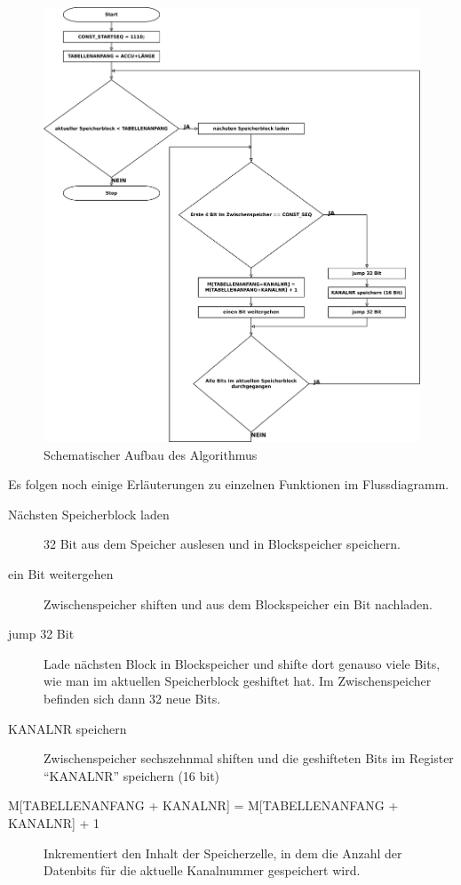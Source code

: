 \begin{figure}[htb]
    \centering
    \includegraphics[width=\textwidth]{pflichtenheft/res/algorithmus.pdf}
    \caption{Schematischer Aufbau des Algorithmus}
    \label{figure:Pflichtenheft-SystemtechnischeLoesung-Loesungsansatz-Algorithmus}
\end{figure}

\clearpage

Es folgen noch einige Erläuterungen zu einzelnen Funktionen im Flussdiagramm.

\begin{description}
    \item[{Nächsten Speicherblock laden}] 32 Bit aus dem Speicher auslesen und in Blockspeicher speichern.
    
    \item[{ein Bit weitergehen}] Zwischenspeicher shiften und aus dem Blockspeicher ein Bit nachladen.
    
    \item[{jump 32 Bit}] Lade nächsten Block in Blockspeicher und shifte dort genauso viele Bits, wie man im aktuellen Speicherblock geshiftet hat. Im Zwischenspeicher befinden sich dann 32 neue Bits.
    
    \item[{KANALNR speichern}] Zwischenspeicher sechszehnmal shiften und die geshifteten Bits im Register "`KANALNR"' speichern (16 bit)
    
    \item[{M[TABELLENANFANG + KANALNR] = M[TABELLENANFANG + KANALNR] + 1}] Inkrementiert den Inhalt der Speicherzelle, in dem die Anzahl der Datenbits für die aktuelle Kanalnummer gespeichert wird.
\end{description}


